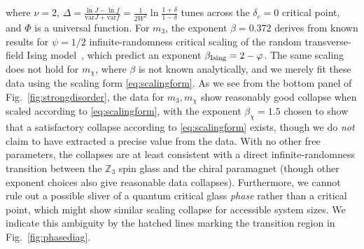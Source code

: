 \documentclass[prb,aps, twocolumn, superscriptaddress]{revtex4-1}
\begin{document}
where $\nu = 2$, $\Delta = \frac{\overline{\ln J} - \overline{\ln f}}{{{\text{var} J}+{\text{var} f}}} =\frac{1}{2W^2}\ln\frac{1+\delta}{1-\delta}$ tunes across the $\delta_c=0$ critical point, and $\Phi$ is a universal function. For $m_3$,  the exponent $\beta = 0.372$ derives from known results for $\psi=1/2$ infinite-randomness critical scaling of the random transverse-field Ising model~\cite{FisherRSRG1,FisherRSRG2}, which predict an exponent $\beta_{\rm Ising} = 2 -\varphi$. The same scaling does not hold for $m_{\chi}$, where $\beta$ is not known analytically, and we merely fit these data using the scaling form \eqref{eq:scalingform}. As we see from the bottom panel of Fig.~\ref{fig:strongdisorder}, the data for ${m_3}, m_\chi$ show reasonably good collapse when scaled according to \eqref{eq:scalingform}, with the exponent $\beta_{\chi} = 1.5$ chosen to show that a satisfactory collapse according to \eqref{eq:scalingform} exists, though we do \emph{not} claim to have extracted a precise value from the data. With no other free parameters, the collapses are at least consistent with a direct infinite-randomness transition between the ${\mathbb{Z}_3}$ spin glass and the chiral paramagnet (though other exponent choices also give  reasonable data collapses). Furthermore, we cannot rule out a possible sliver of a quantum critical glass {\it phase} rather than a critical point, which might show similar scaling collapse for accessible system sizes. We indicate this ambiguity by the hatched lines marking the transition region in Fig.~\ref{fig:phasediag}.
\end{document}
